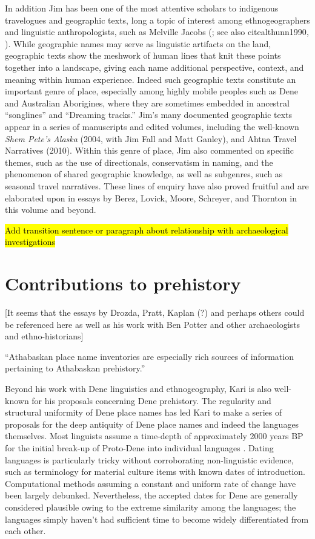 In addition Jim has been one of the most attentive scholars to indigenous travelogues and geographic texts, long a topic of interest among ethnogeographers and linguistic anthropologists, such as Melville Jacobs (\citeyear{jacobs1936}; see also citealt{hunn1990}, \citealt{thornton2012}). While geographic names may serve as linguistic artifacts on the land, geographic texts show the meshwork of human lines that knit these points together into a landscape, giving each name additional perspective, context, and meaning within human experience. Indeed such geographic texts constitute an important genre of place, especially among highly mobile peoples such as Dene and Australian Aborigines, where they are sometimes embedded in ancestral “songlines” and “Dreaming tracks.” Jim’s many documented geographic texts appear in a series of manuscripts and edited volumes, including the well-known \textit{Shem Pete’s Alaska} (2004, with Jim Fall and Matt Ganley), and Ahtna Travel Narratives (2010). Within this genre of place, Jim also commented on specific themes, such as the use of directionals, conservatism in naming, and the phenomenon of shared geographic knowledge, as well as subgenres, such as seasonal travel narratives. These lines of enquiry have also proved fruitful and are elaborated upon in essays by Berez, Lovick, Moore, Schreyer, and Thornton in this volume and beyond.

\hl{Add transition sentence or paragraph about relationship with archaeological investigations}

\section{Contributions to prehistory}
[It seems that the essays by Drozda, Pratt, Kaplan (?) and perhaps others could be referenced here as well as his work with Ben Potter and other archaeologists and ethno-historians]

``Athabaskan place name inventories are especially rich sources of information pertaining to Athabaskan prehistory.'' \citep[444]{kari1996a}

Beyond his work with Dene linguistics and ethnogeography, Kari is also well-known for his proposals concerning Dene prehistory. The regularity and structural uniformity of Dene place names has led Kari to make a series of proposals for the deep antiquity of Dene place names and indeed the languages themselves. Most linguists assume a time-depth of approximately 2000 years BP for the initial break-up of Proto-Dene into individual languages \citep{krauss1973a,holman2011}. Dating languages is particularly tricky without corroborating non-linguistic evidence, such as terminology for material culture items with known dates of introduction. Computational methods assuming a constant and uniform rate of change have been largely debunked. Nevertheless, the accepted dates for Dene are generally considered plausible owing to the extreme similarity among the languages; the languages simply haven't had sufficient time to become widely differentiated from each other.

